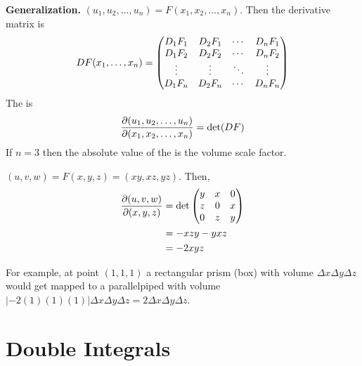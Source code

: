 \documentclass[english, 11pt]{article}
\begin{document}
\textbf{Generalization.} $(u_1, u_2, \ldots, u_n) = F(x_1, x_2, \ldots, x_n)$. Then the derivative matrix is
\[ DF(x_1, \ldots, x_n) = \left( \begin{matrix} D_1F_1 & D_2F_1 & \cdots & D_nF_1 \\ D_1F_2 & D_2F_2 &  \cdots & D_nF_2 \\ \vdots & \vdots & \ddots & \vdots \\ D_1F_n & D_2F_n & \cdots & D_nF_n \end{matrix} \right) \]
The  is
\[ \frac{\partial(u_1, u_2, \ldots, u_n)}{\partial(x_1, x_2, \ldots, x_n)} = \det (DF) \]
If $n = 3$ then the absolute value of the  is the volume scale factor.

\begin{exmp}
  $(u,v,w) = F(x,y,z) = (xy,xz,yz)$. Then,
  \begin{align*}
    \frac{\partial(u,v,w)}{\partial(x,y,z)} & = \det \left( \begin{matrix} y & x & 0 \\ z & 0 & x \\ 0 & z & y \end{matrix} \right) \\
                               & = -xzy - yxz \\
                               & = -2xyz
  \end{align*}
\end{exmp}

For example, at point $(1,1,1)$ a rectangular prism (box) with volume $\Delta x \Delta y \Delta z$ would get mapped to a parallelpiped with volume $|-2(1)(1)(1)|\Delta x \Delta y \Delta z = 2\Delta x \Delta y \Delta z$.

\section{Double Integrals}
\end{document}
